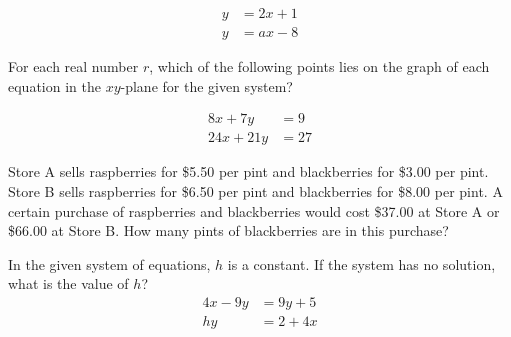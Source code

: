 \[
\begin{aligned}
y &= 2x + 1 \\
y &= ax - 8
\end{aligned}
\]

\vspace{0.75em}


\newpage
\noindent\markforreview

\vspace{1em}

For each real number \( r \), which of the following points lies on the graph of each equation in the \( xy \)-plane for the given system?

\[
\begin{aligned}
8x + 7y &= 9 \\
24x + 21y &= 27
\end{aligned}
\]

\vspace{0.75em}


\vspace{2em}


\noindent\markforreview

\vspace{1em}

Store A sells raspberries for \$5.50 per pint and blackberries for \$3.00 per pint. Store B sells raspberries for \$6.50 per pint and blackberries for \$8.00 per pint. A certain purchase of raspberries and blackberries would cost \$37.00 at Store A or \$66.00 at Store B. How many pints of blackberries are in this purchase?

\vspace{0.75em}




\newpage


\noindent\markforreview

\vspace{1em}

In the given system of equations, \( h \) is a constant. If the system has no solution, what is the value of \( h \)?
\[
\begin{aligned}
4x - 9y &= 9y + 5 \\
hy &= 2 + 4x
\end{aligned}
\]

